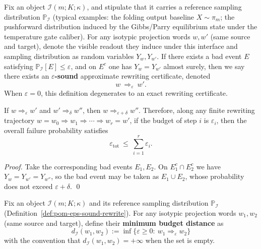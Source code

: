 \begin{definition}\label{def:pom-eps-sound-rewrite}
Fix an object \(\mathcal{I}(m;K;\kappa)\), and stipulate that it carries a reference sampling distribution \(\mathbb{P}_{\mathcal I}\)
(typical examples: the folding output baseline \(X\sim\pi_m\); the pushforward distribution induced by the Gibbs/Parry equilibrium state under the temperature gate caliber).
For any isotypic projection words \(w,w'\) (same source and target), denote the visible readout they induce under this interface and sampling distribution as random variables
\(
Y_w,Y_{w'}.
\)
If there exists a bad event \(E\) satisfying \(\mathbb{P}_{\mathcal I}[E]\le \varepsilon\), and on \(E^c\) one has \(Y_w=Y_{w'}\) almost surely,
then we say there exists an \textbf{\(\varepsilon\)-sound} approximate rewriting certificate, denoted
$$
w\ \Longrightarrow_{\varepsilon}\ w'.
$$
When \(\varepsilon=0\), this definition degenerates to an exact rewriting certificate.
\end{definition}

\begin{proposition}\label{prop:pom-eps-sound-compose}
If \(w\Longrightarrow_{\varepsilon}w'\) and \(w'\Longrightarrow_{\delta}w''\), then \(w\Longrightarrow_{\varepsilon+\delta}w''\).
Therefore, along any finite rewriting trajectory \(w=w_0\Rightarrow w_1\Rightarrow\cdots\Rightarrow w_r=w'\), if the budget of step \(i\) is \(\varepsilon_i\), then the overall failure probability satisfies
\[
\varepsilon_{\mathrm{tot}}\ \le\ \sum_{i=1}^{r}\varepsilon_i.
\]
\end{proposition}
\begin{proof}
Take the corresponding bad events \(E_1,E_2\).
On \(E_1^c\cap E_2^c\) we have \(Y_w=Y_{w'}=Y_{w''}\), so the bad event may be taken as \(E_1\cup E_2\), whose probability does not exceed \(\varepsilon+\delta\). \qed
\end{proof}

\begin{definition}\label{def:pom-eps-distance}
Fix an object \(\mathcal{I}(m;K;\kappa)\) and its reference sampling distribution \(\mathbb{P}_{\mathcal I}\) (Definition~\ref{def:pom-eps-sound-rewrite}).
For any isotypic projection words \(w_1,w_2\) (same source and target), define their \textbf{minimum budget distance} as
\[
\boxed{\;
d_{\mathcal I}(w_1,w_2)
:=
\inf\{\varepsilon\ge 0:\ w_1\Longrightarrow_{\varepsilon} w_2\}\;}
\]
with the convention that \(d_{\mathcal I}(w_1,w_2)=+\infty\) when the set is empty.
\end{definition}

